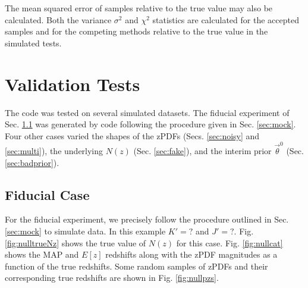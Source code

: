 \documentclass[preprint]{aastex}
\begin{document}
The mean squared error of samples relative to the true value may also be calculated.  Both the variance $\sigma^{2}$ and $\chi^{2}$ statistics are calculated for the accepted samples and for the competing methods relative to the true value in the simulated tests.

\clearpage
\section{Validation Tests}
\label{sec:valid}

The code was tested on several simulated datasets.  The fiducial experiment of Sec. \ref{sec:null} was generated by code following the procedure given in Sec. \ref{sec:mock}.  Four other cases varied the shapes of the zPDFs (Secs. \ref{sec:noisy} and \ref{sec:multi}), the underlying $N(z)$ (Sec. \ref{sec:fake}), and the interim prior $\vec{\theta}^{0}$ (Sec. \ref{sec:badprior}).  

\clearpage
\subsection{Fiducial Case}
\label{sec:null}

For the fiducial experiment, we precisely follow the procedure outlined in Sec. \ref{sec:mock} to simulate data.  In this example $K'=?$ and $J'=?$.  Fig. \ref{fig:nulltrueNz} shows the true value of $N(z)$ for this case.  Fig. \ref{fig:nullcat} shows the MAP and $E[z]$ redshifts along with the zPDF magnitudes as a function of the true redshifts.  Some random samples of zPDFs and their corresponding true redshifts are shown in Fig. \ref{fig:nullpzs}.
\end{document}
